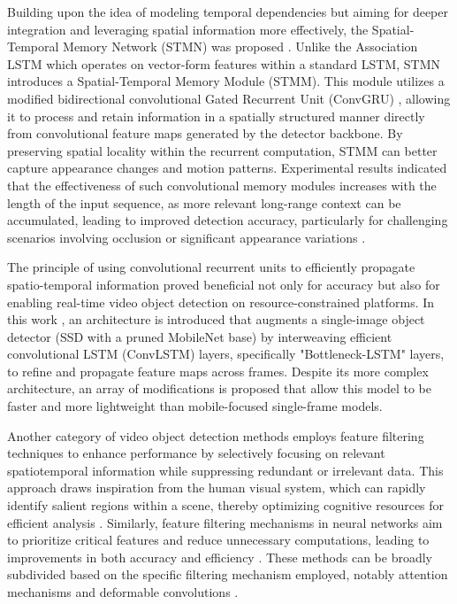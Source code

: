 Building upon the idea of modeling temporal dependencies but aiming for deeper integration and leveraging spatial information more effectively, the Spatial-Temporal Memory Network (STMN) was proposed \cite{xiaoVideoObjectDetection2018}. Unlike the Association LSTM which operates on vector-form features within a standard LSTM, STMN introduces a Spatial-Temporal Memory Module (STMM). This module utilizes a modified bidirectional convolutional Gated Recurrent Unit (ConvGRU) \cite{ballasDelvingDeeperConvolutional2016}, allowing it to process and retain information in a spatially structured manner directly from convolutional feature maps generated by the detector backbone. By preserving spatial locality within the recurrent computation, STMM can better capture appearance changes and motion patterns. Experimental results indicated that the effectiveness of such convolutional memory modules increases with the length of the input sequence, as more relevant long-range context can be accumulated, leading to improved detection accuracy, particularly for challenging scenarios involving occlusion or significant appearance variations \cite{xiaoVideoObjectDetection2018}.

The principle of using convolutional recurrent units to efficiently propagate spatio-temporal information proved beneficial not only for accuracy but also for enabling real-time video object detection on resource-constrained platforms. In this work \cite{liuMobileVideoObject2018}, an architecture is introduced that augments a single-image object detector (SSD with a pruned MobileNet base) by interweaving efficient convolutional LSTM (ConvLSTM) \cite{shiConvolutionalLSTMNetwork2015} layers, specifically "Bottleneck-LSTM" layers, to refine and propagate feature maps across frames. Despite its more complex architecture, an array of modifications is proposed that allow this model to be faster and more lightweight than mobile-focused single-frame models.


Another category of video object detection methods employs feature filtering techniques to enhance performance by selectively focusing on relevant spatiotemporal information while suppressing redundant or irrelevant data. This approach draws inspiration from the human visual system, which can rapidly identify salient regions within a scene, thereby optimizing cognitive resources for efficient analysis \cite{ittiModelSaliencybasedVisual1998}. Similarly, feature filtering mechanisms in neural networks aim to prioritize critical features and reduce unnecessary computations, leading to improvements in both accuracy and efficiency \cite{jiaoNewGenerationDeep2022}. These methods can be broadly subdivided based on the specific filtering mechanism employed, notably attention mechanisms \cite{bahdanauNeuralMachineTranslation2016a, vaswaniAttentionAllYou2023} and deformable convolutions \cite{daiDeformableConvolutionalNetworks2017a}.

